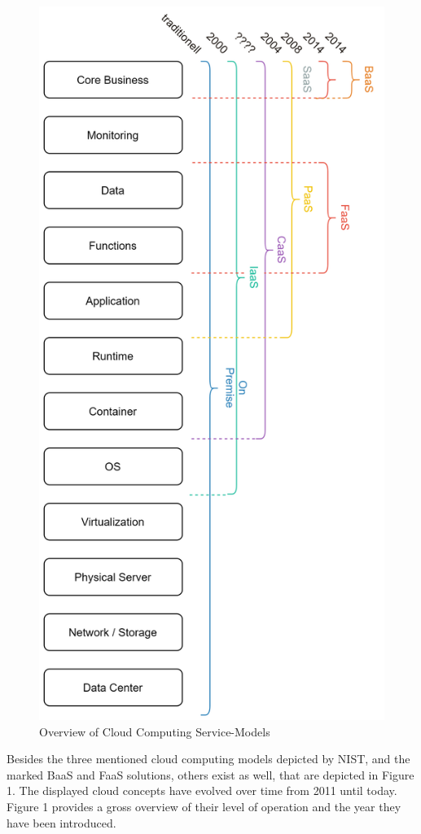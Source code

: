 \documentclass[a4paper,11pt, pagesize]{scrartcl}
\begin{document}
\begin{spacing}{1.2}
\begin{figure}[H]
\label{fig:cloudComputingConcepts}
\centering
\includegraphics[angle=90,width=1\textwidth]{serviceModels}
\caption{Overview of Cloud Computing Service-Models}
\end{figure}
Besides the three mentioned cloud computing models depicted by NIST, and the marked BaaS and FaaS solutions, others exist as well, that are depicted in Figure 1. The displayed cloud concepts have evolved over time from 2011 until today. Figure 1 provides a gross overview of their level of operation and the year they have been introduced. 

\end{spacing}
\end{document}
